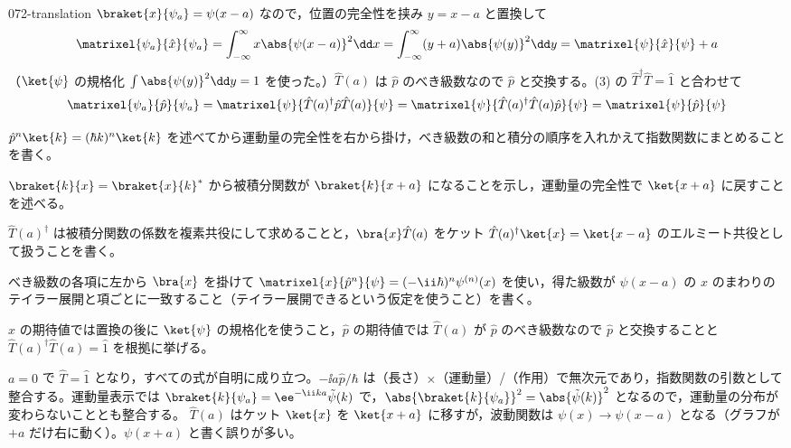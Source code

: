 \documentclass[uplatex,dvipdfmx,a4paper,11pt]{jsarticle}
\begin{document}
\begin{kaisetsu}{072-translation}
 $\braket{x}{\psi_{a}}=\psi(x-a)$ なので，位置の完全性を挟み $y=x-a$ と置換して
\[ \matrixel{\psi_{a}}{\hat{x}}{\psi_{a}}=\int_{-\infty}^{\infty}x\abs{\psi(x-a)}^{2}\dd x=\int_{-\infty}^{\infty}(y+a)\abs{\psi(y)}^{2}\dd y=\matrixel{\psi}{\hat{x}}{\psi}+a \]
（$\ket{\psi}$ の規格化 $\int\abs{\psi(y)}^{2}\dd y=1$ を使った。）$\hat{T}(a)$ は $\hat{p}$ のべき級数なので $\hat{p}$ と交換する。(3) の $\hat{T}^{\dagger}\hat{T}=\hat{1}$ と合わせて
\[ \matrixel{\psi_{a}}{\hat{p}}{\psi_{a}}=\matrixel{\psi}{\hat{T}(a)^{\dagger}\hat{p}\hat{T}(a)}{\psi}=\matrixel{\psi}{\hat{T}(a)^{\dagger}\hat{T}(a)\hat{p}}{\psi}=\matrixel{\psi}{\hat{p}}{\psi} \]
\begin{ronten}
  \item {} $\hat{p}^{n}\ket{k}=(\hbar k)^{n}\ket{k}$ を述べてから運動量の完全性を右から掛け，べき級数の和と積分の順序を入れかえて指数関数にまとめることを書く。
  \item {} $\braket{k}{x}=\braket{x}{k}^{*}$ から被積分関数が $\braket{k}{x+a}$ になることを示し，運動量の完全性で $\ket{x+a}$ に戻すことを述べる。
  \item {} $\hat{T}(a)^{\dagger}$ は被積分関数の係数を複素共役にして求めることと，$\bra{x}\hat{T}(a)$ をケット $\hat{T}(a)^{\dagger}\ket{x}=\ket{x-a}$ のエルミート共役として扱うことを書く。
  \item {} べき級数の各項に左から $\bra{x}$ を掛けて $\matrixel{x}{\hat{p}^{n}}{\psi}=(-\ii\hbar)^{n}\psi^{(n)}(x)$ を使い，得た級数が $\psi(x-a)$ の $x$ のまわりのテイラー展開と項ごとに一致すること（テイラー展開できるという仮定を使うこと）を書く。
  \item {} $\hat{x}$ の期待値では置換の後に $\ket{\psi}$ の規格化を使うこと，$\hat{p}$ の期待値では $\hat{T}(a)$ が $\hat{p}$ のべき級数なので $\hat{p}$ と交換することと $\hat{T}(a)^{\dagger}\hat{T}(a)=\hat{1}$ を根拠に挙げる。
\end{ronten}
\kenzan $a=0$ で $\hat{T}=\hat{1}$ となり，すべての式が自明に成り立つ。$-\ii a\hat{p}/\hbar$ は（長さ）$\times$（運動量）/（作用）で無次元であり，指数関数の引数として整合する。運動量表示では $\braket{k}{\psi_{a}}=\ee^{-\ii ka}\tilde{\psi}(k)$ で，$\abs{\braket{k}{\psi_{a}}}^{2}=\abs{\tilde{\psi}(k)}^{2}$ となるので，運動量の分布が変わらないこととも整合する。
\tsumazuki $\hat{T}(a)$ はケット $\ket{x}$ を $\ket{x+a}$ に移すが，波動関数は $\psi(x)\to\psi(x-a)$ となる（グラフが $+a$ だけ右に動く）。$\psi(x+a)$ と書く誤りが多い。
\end{kaisetsu}
\end{document}
